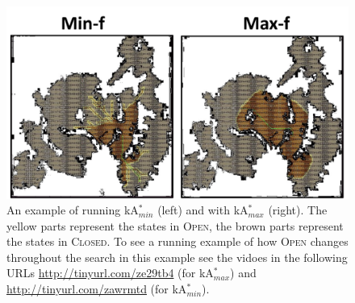 \documentclass{aicom2e}
\newcommand{\astar}{A$^*$}
\newcommand{\kastar}{kA$^*$}
\newcommand{\kastarmin}{kA$^*_{min}$}
\newcommand{\kastarmax}{kA$^*_{max}$}
\newcommand{\kxastar}{k$\times$A$^*$}
\newcommand{\open}{\textsc{Open}}
\newcommand{\closed}{\textsc{Closed}}
\begin{document}


\begin{figure}
    \includegraphics[width=\columnwidth]{min-vs-max}
    \caption{An example of running \kastarmin{} (left) and with \kastarmax{} (right). The yellow parts represent the states in \open{}, the brown parts represent the states in \closed{}. 
    To see a running example of how \open{} changes throughout the search in  this example see the vidoes in the following URLs \url{http://tinyurl.com/ze29tb4} (for \kastarmax) and
    \url{http://tinyurl.com/zawrmtd} (for \kastarmin).
}
    \label{fig:min-vs-max}
\end{figure}
\end{document}
